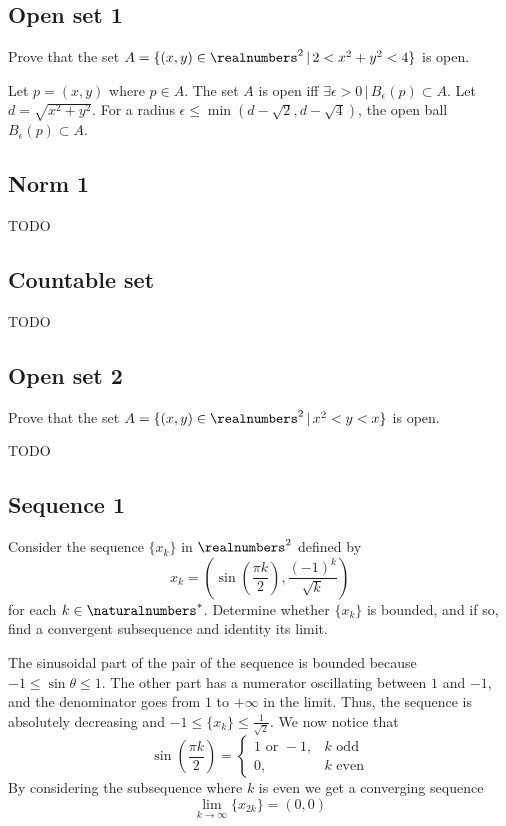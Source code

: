 \documentclass[a4paper]{article}
\begin{document}
\subsection{Open set 1}

Prove that the set \(A=\{(x,y) \in {\realnumbers}^2 \,|\, 2<x^2+y^2<4\}\)
is open.

Let \(p = (x,y)\) where \(p \in A\).
The set \(A\) is open iff \(\exists \epsilon > 0 \,|\, B_\epsilon(p) \subset A \).
Let \(d = \sqrt{x^2 + y^2}\). For a radius \(\epsilon \leq \min(d-\sqrt{2}, d-\sqrt{4})\),
the open ball \(B_\epsilon(p) \subset A\).

\subsection{Norm 1}

TODO

\subsection{Countable set}

TODO %

\subsection{Open set 2}

Prove that the set \(A=\{(x,y) \in {\realnumbers}^2 \,|\, x^2<y<x\}\)
is open.

TODO

\subsection{Sequence 1}

Consider the sequence \(\{x_k\}\) in \({\realnumbers}^2\)
defined by \[ x_k = \left( \sin\left(\frac{\pi k}{2}\right), \frac{{(-1)}^k}{\sqrt{k}} \right) \]
for each \(k \in {\naturalnumbers}^*\).
Determine whether \(\{x_k\}\) is bounded, and if so, find a convergent subsequence
and identity its limit.

The sinusoidal part of the pair of the sequence is bounded because \(-1 \leq \sin\theta \leq 1\).
The other part has a numerator oscillating between \(1\) and \(-1\),
and the denominator goes from \(1\) to \(+\infty\) in the limit.
Thus, the sequence is absolutely decreasing and \(-1 \leq \{x_k\} \leq \frac{1}{\sqrt{2}}\).
We now notice that
\[
    \sin\left(\frac{\pi k}{2}\right)
    = \begin{cases}
        1 \text{ or } -1, & k \text{ odd} \\
        0, & k \text{ even}
    \end{cases}
\]
By considering the subsequence where \(k\) is even we get a converging sequence
\[
    \lim_{k \to \infty} \{x_{2k}\} = (0, 0) 
\]
\end{document}
